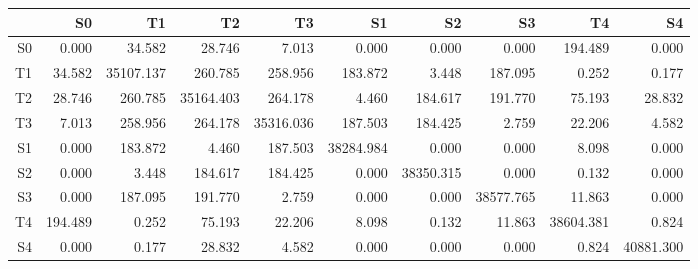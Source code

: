 \begin{tabular}{r|rrrrrrrrr}
 &          S0 &          T1 &          T2 &          T3 &          S1 &          S2 &          S3 &          T4 &          S4 \\
\hline
S0 &       0.000 &      34.582 &      28.746 &       7.013 &       0.000 &       0.000 &       0.000 &     194.489 &       0.000 \\
T1 &      34.582 &   35107.137 &     260.785 &     258.956 &     183.872 &       3.448 &     187.095 &       0.252 &       0.177 \\
T2 &      28.746 &     260.785 &   35164.403 &     264.178 &       4.460 &     184.617 &     191.770 &      75.193 &      28.832 \\
T3 &       7.013 &     258.956 &     264.178 &   35316.036 &     187.503 &     184.425 &       2.759 &      22.206 &       4.582 \\
S1 &       0.000 &     183.872 &       4.460 &     187.503 &   38284.984 &       0.000 &       0.000 &       8.098 &       0.000 \\
S2 &       0.000 &       3.448 &     184.617 &     184.425 &       0.000 &   38350.315 &       0.000 &       0.132 &       0.000 \\
S3 &       0.000 &     187.095 &     191.770 &       2.759 &       0.000 &       0.000 &   38577.765 &      11.863 &       0.000 \\
T4 &     194.489 &       0.252 &      75.193 &      22.206 &       8.098 &       0.132 &      11.863 &   38604.381 &       0.824 \\
S4 &       0.000 &       0.177 &      28.832 &       4.582 &       0.000 &       0.000 &       0.000 &       0.824 &   40881.300 \\
\end{tabular}
